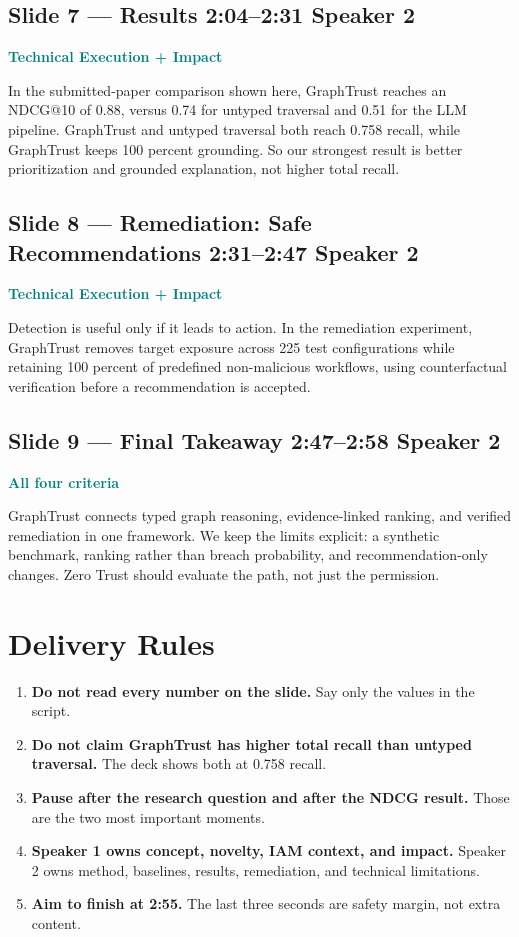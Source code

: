 \documentclass[11pt,a4paper]{article}
\newcommand{\speakertwo}{\textbf{Speaker 2}}
\newcommand{\criterion}[1]{\textcolor{Teal}{\textbf{#1}}}
\newcommand{\timebox}[1]{\textcolor{Muted}{\textbf{#1}}}
\begin{document}
\subsection*{Slide 7 --- Results \hfill \timebox{2:04--2:31} \quad \speakertwo}
\criterion{Technical Execution + Impact}

In the submitted-paper comparison shown here, GraphTrust reaches an NDCG@10 of 0.88, versus 0.74 for untyped traversal and 0.51 for the LLM pipeline. GraphTrust and untyped traversal both reach 0.758 recall, while GraphTrust keeps 100 percent grounding. So our strongest result is better prioritization and grounded explanation, not higher total recall.

\subsection*{Slide 8 --- Remediation: Safe Recommendations \hfill \timebox{2:31--2:47} \quad \speakertwo}
\criterion{Technical Execution + Impact}

Detection is useful only if it leads to action. In the remediation experiment, GraphTrust removes target exposure across 225 test configurations while retaining 100 percent of predefined non-malicious workflows, using counterfactual verification before a recommendation is accepted.

\subsection*{Slide 9 --- Final Takeaway \hfill \timebox{2:47--2:58} \quad \speakertwo}
\criterion{All four criteria}

GraphTrust connects typed graph reasoning, evidence-linked ranking, and verified remediation in one framework. We keep the limits explicit: a synthetic benchmark, ranking rather than breach probability, and recommendation-only changes. Zero Trust should evaluate the path, not just the permission.

\section*{Delivery Rules}

\begin{enumerate}[leftmargin=1.5em,itemsep=0.25em]
  \item \textbf{Do not read every number on the slide.} Say only the values in the script.
  \item \textbf{Do not claim GraphTrust has higher total recall than untyped traversal.} The deck shows both at 0.758 recall.
  \item \textbf{Pause after the research question and after the NDCG result.} Those are the two most important moments.
  \item \textbf{Speaker 1 owns concept, novelty, IAM context, and impact.} Speaker 2 owns method, baselines, results, remediation, and technical limitations.
  \item \textbf{Aim to finish at 2:55.} The last three seconds are safety margin, not extra content.
\end{enumerate}
\end{document}
